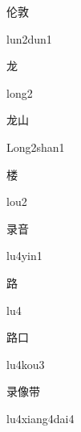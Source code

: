 \begin{multicols*}{2}
\begin{verbete}{伦敦}
\begin{pronuncia}{lun2dun1}
\end{pronuncia}
\end{verbete}

\begin{verbete}[long2]{龙}
\begin{pronuncia}{long2}
\end{pronuncia}
\end{verbete}

\begin{verbete}{龙山}
\begin{pronuncia}{Long2shan1}
\end{pronuncia}
\end{verbete}

\begin{verbete}[lou2]{楼}
\begin{pronuncia}{lou2}
\end{pronuncia}
\end{verbete}

\begin{verbete}[lu4yin1]{录音}
\begin{pronuncia}{lu4yin1}
\end{pronuncia}
\end{verbete}

\begin{verbete}[lu4]{路}
\begin{pronuncia}{lu4}
\end{pronuncia}
\end{verbete}

\begin{verbete}[lu4kou3]{路口}
\begin{pronuncia}{lu4kou3}
\end{pronuncia}
\end{verbete}

\begin{verbete}{录像带}
\begin{pronuncia}{lu4xiang4dai4}
\end{pronuncia}
\end{verbete}


\end{multicols*}
